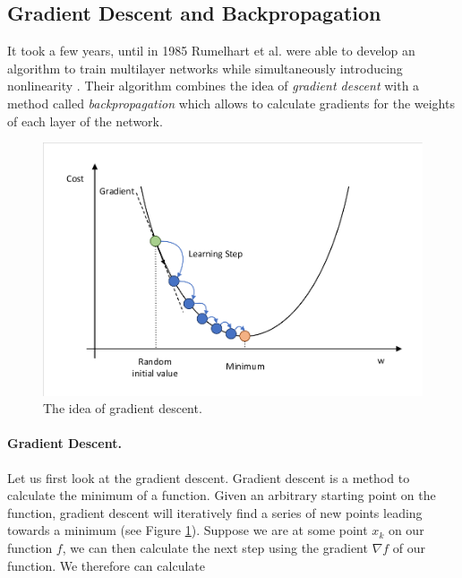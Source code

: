 \subsection{Gradient Descent and Backpropagation} \label{sec:Backpropagation}
It took a few years, until in 1985 Rumelhart et al. were able to develop an algorithm to train multilayer networks while simultaneously introducing nonlinearity \cite{rumelhart1985learning}. Their algorithm combines the idea of \textit{gradient descent} with a method called \textit{backpropagation} which allows to calculate gradients for the weights of each layer of the network.

\begin{figure}[ht]
  
  \begin{center}
      \includegraphics[trim=10px 10px 10px 10px, clip, width=0.75\columnwidth]{figures/deeplearning/GradientDescent.pdf}
  \end{center}
  
  \caption[Gradient Descent]{The idea of gradient descent.}
  \label{fig:GradientDescent}
\end{figure}

\paragraph{Gradient Descent.} Let us first look at the gradient descent. Gradient descent is a method to calculate the minimum of a function. Given an arbitrary starting point on the function, gradient descent will iteratively find a series of new points leading towards a minimum (see Figure \ref{fig:GradientDescent}). Suppose we are at some point $x_k$ on our function $f$, we can then calculate the next step using the gradient $\nabla f$ of our function. We therefore can calculate 

